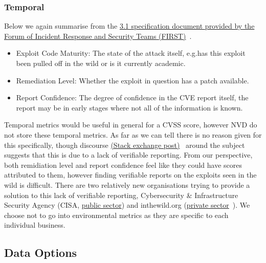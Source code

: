 \subsubsection{Temporal}

Below we again summarise from the \href{https://www.first.org/cvss/v3.1/specification-document}{3.1 specification document provided by the Forum of Incident Response and Security Teams (FIRST)}~\cite{CVSS_31}.

\begin{itemize}
	\item Exploit Code Maturity: The state of the attack itself, e.g.\@ has this exploit been pulled off in the wild or is it currently academic.

	\item Remediation Level: Whether the exploit in question has a patch available.
	\item Report Confidence: The degree of confidence in the CVE report itself, the report may be in early stages where not all of the information is known.
\end{itemize}


\bigskip


Temporal metrics would be useful in general for a CVSS score, however NVD do not store these temporal metrics. As far as we can tell there is no reason given for this specifically, though discourse \href{https://security.stackexchange.com/questions/270257/cvss-v3-and-v3-1-missing-temporal-metrics-exploit-code-maturity-and-remediation}{(Stack exchange post)}~\cite{stack_exchange} around the subject suggests that this is due to a lack of verifiable reporting. From our perspective, both remidiation level and report confidence feel like they could have scores attributed to them, however finding verifiable reports on the exploits seen in the wild is difficult. There are two relatively new organisations trying to provide a solution to this lack of verifiable reporting, Cybersecurity \& Infrastructure Security Agency (CISA, \href{https://www.cisa.gov/known-exploited-vulnerabilities-catalog}{public sector}) and inthewild.org (\href{https://inthewild.io/}{private sector}~\cite{cisa}). We choose not to go into environmental metrics as they are specific to each individual business.


\subsection{Data Options}

